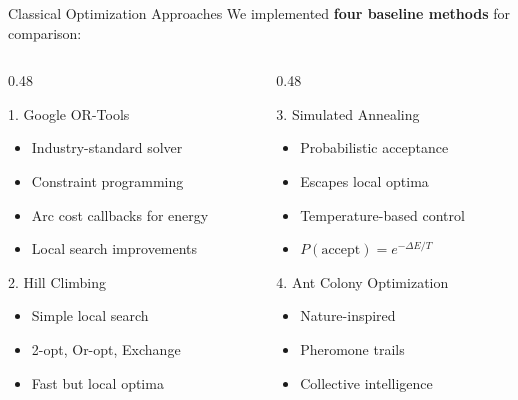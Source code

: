 \documentclass[aspectratio=169,11pt]{beamer}
\begin{document}
\begin{frame}{Classical Optimization Approaches}
    We implemented \textbf{four baseline methods} for comparison:
    
    \vspace{0.5cm}
    \begin{columns}[T]
        \begin{column}{0.48\textwidth}
            \begin{block}{1. Google OR-Tools}
                \begin{itemize}
                    \item Industry-standard solver
                    \item Constraint programming
                    \item Arc cost callbacks for energy
                    \item Local search improvements
                \end{itemize}
            \end{block}
            
            \begin{block}{2. Hill Climbing}
                \begin{itemize}
                    \item Simple local search
                    \item 2-opt, Or-opt, Exchange
                    \item Fast but local optima
                \end{itemize}
            \end{block}
        \end{column}
        \begin{column}{0.48\textwidth}
            \begin{block}{3. Simulated Annealing}
                \begin{itemize}
                    \item Probabilistic acceptance
                    \item Escapes local optima
                    \item Temperature-based control
                    \item $P(\text{accept}) = e^{-\Delta E/T}$
                \end{itemize}
            \end{block}
            
            \begin{block}{4. Ant Colony Optimization}
                \begin{itemize}
                    \item Nature-inspired
                    \item Pheromone trails
                    \item Collective intelligence
                \end{itemize}
            \end{block}
        \end{column}
    \end{columns}
\end{frame}
\end{document}
